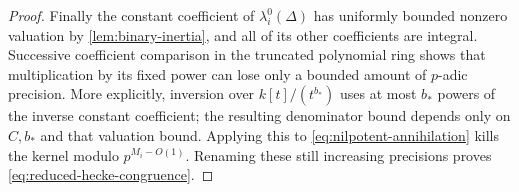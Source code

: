 \begin{proof}
Finally the constant coefficient of $\lambda_i^0(\Delta)$ has
uniformly bounded nonzero valuation by \cref{lem:binary-inertia},
and all of its other coefficients are integral.  Successive
coefficient comparison in the truncated polynomial ring shows that
multiplication by its fixed power can lose only a bounded amount of
$p$-adic precision.  More explicitly, inversion over $k[t]/(t^{b_*})$
uses at most $b_*$ powers of the inverse constant coefficient; the
resulting denominator bound depends only on $C,b_*$ and that
valuation bound.  Applying this to
\cref{eq:nilpotent-annihilation} kills the kernel modulo $p^{M_i-O(1)}$.
Renaming these still increasing precisions proves
\cref{eq:reduced-hecke-congruence}.
\end{proof}
